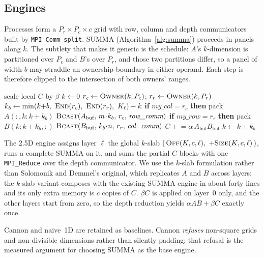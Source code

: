 \documentclass[conference,10pt]{IEEEtran}
\begin{document}
\subsection{Engines}

Processes form a $P_r \times P_c \times c$ grid with row, column and depth
communicators built by \texttt{MPI\_Comm\_split}. SUMMA
(Algorithm~\ref{alg:summa}) proceeds in panels along $k$. The subtlety that
makes it generic is the schedule: $A$'s $k$-dimension is partitioned over
$P_c$ and $B$'s over $P_r$, and those two partitions differ, so a panel of
width $b$ may straddle an ownership boundary in either operand. Each step is
therefore clipped to the intersection of both owners' ranges.

\begin{algorithm}[t]
\caption{Generic SUMMA over the $k$-range $[K_0,K_0{+}K_\ell)$}
\label{alg:summa}
\begin{algorithmic}[1]
\State scale local $C$ by $\beta$ 
\State $k \gets 0$
  \State $r_c \gets \textsc{Owner}(k, P_c)$; \; $r_r \gets \textsc{Owner}(k, P_r)$
  \State $k_b \gets \min(k{+}b,\ \textsc{End}(r_c),\ \textsc{End}(r_r),\ K_\ell) - k$
  \State \textbf{if} $my\_col = r_c$ \textbf{then} pack $A(:,k{:}k{+}k_b)$
  \State $\textsc{Bcast}(A_{\text{buf}},\, m\!\cdot\!k_b,\, r_c,\, \textit{row\_comm})$
  \State \textbf{if} $my\_row = r_r$ \textbf{then} pack $B(k{:}k{+}k_b,:)$
  \State $\textsc{Bcast}(B_{\text{buf}},\, k_b\!\cdot\!n,\, r_r,\, \textit{col\_comm})$
  \State $C \mathrel{+}= \alpha\, A_{\text{buf}} B_{\text{buf}}$
  \State $k \gets k + k_b$
\EndWhile
\end{algorithmic}
\end{algorithm}

The 2.5D engine assigns layer $\ell$ the global $k$-slab
$[\,\textsc{Off}(K,c,\ell),\ +\textsc{Size}(K,c,\ell)\,)$, runs a complete SUMMA
on it, and sums the partial $C$ blocks with one \texttt{MPI\_Reduce} over the
depth communicator. We use the $k$-slab formulation rather than Solomonik and
Demmel's original, which replicates $A$ and $B$ across layers: the $k$-slab
variant composes with the existing SUMMA engine in about forty lines and its
only extra memory is $c$ copies of $C$. $\beta C$ is applied on layer~0 only,
and the other layers start from zero, so the depth reduction yields
$\alpha AB + \beta C$ exactly once.

Cannon and naive~1D are retained as baselines. Cannon \emph{refuses} non-square
grids and non-divisible dimensions rather than silently padding; that refusal
is the measured argument for choosing SUMMA as the base engine.
\end{document}
